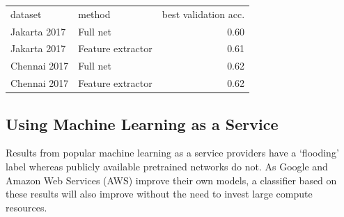 \begin{tabular}{llr}\label{table:transfer_learning}
\toprule
      dataset &             method &  best validation acc. \\
 Jakarta 2017 &           Full net &                  0.60 \\
\midrule
 Jakarta 2017 &  Feature extractor &                  0.61 \\
 Chennai 2017 &           Full net &                  0.62 \\
 Chennai 2017 &  Feature extractor &                  0.62 \\
\bottomrule
\end{tabular}

\subsection{Using Machine Learning as a Service}
Results from popular machine learning as a service providers have a `flooding'
label whereas publicly available pretrained networks do not.
As Google and Amazon Web Services (AWS) improve their own models, a classifier
based on these results will also improve without the need to invest large
compute resources.

